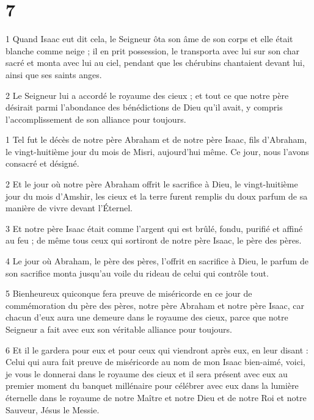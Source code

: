 \chapter{7}

\par 1 Quand Isaac eut dit cela, le Seigneur ôta son âme de son corps et elle était blanche comme neige ; il en prit possession, le transporta avec lui sur son char sacré et monta avec lui au ciel, pendant que les chérubins chantaient devant lui, ainsi que ses saints anges.

\par 2 Le Seigneur lui a accordé le royaume des cieux ; et tout ce que notre père désirait parmi l'abondance des bénédictions de Dieu qu'il avait, y compris l'accomplissement de son alliance pour toujours.


\par 1 Tel fut le décès de notre père Abraham et de notre père Isaac, fils d'Abraham, le vingt-huitième jour du mois de Misri, aujourd'hui même. Ce jour, nous l'avons consacré et désigné.

\par 2 Et le jour où notre père Abraham offrit le sacrifice à Dieu, le vingt-huitième jour du mois d'Amshir, les cieux et la terre furent remplis du doux parfum de sa manière de vivre devant l'Éternel.

\par 3 Et notre père Isaac était comme l'argent qui est brûlé, fondu, purifié et affiné au feu ; de même tous ceux qui sortiront de notre père Isaac, le père des pères.

\par 4 Le jour où Abraham, le père des pères, l'offrit en sacrifice à Dieu, le parfum de son sacrifice monta jusqu'au voile du rideau de celui qui contrôle tout.

\par 5 Bienheureux quiconque fera preuve de miséricorde en ce jour de commémoration du père des pères, notre père Abraham et notre père Isaac, car chacun d'eux aura une demeure dans le royaume des cieux, parce que notre Seigneur a fait avec eux son véritable alliance pour toujours.

\par 6 Et il le gardera pour eux et pour ceux qui viendront après eux, en leur disant : Celui qui aura fait preuve de miséricorde au nom de mon Isaac bien-aimé, voici, je vous le donnerai dans le royaume des cieux et il sera présent avec eux au premier moment du banquet millénaire pour célébrer avec eux dans la lumière éternelle dans le royaume de notre Maître et notre Dieu et de notre Roi et notre Sauveur, Jésus le Messie.

